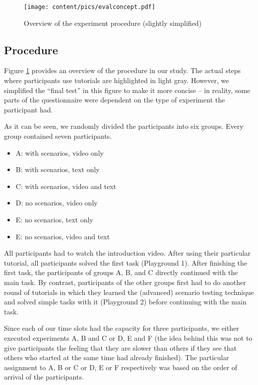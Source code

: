 \begin{figure}[b]
	\texttt{[image: content/pics/evalconcept.pdf]}
	\caption{Overview of the experiment procedure (slightly simplified)}
	\label{fig:evalconcept}
\end{figure}



\subsection{Procedure}
\label{subsec:procedure}
Figure \ref{fig:evalconcept} provides an overview of the procedure in our study. The actual steps where participants use tutorials are highlighted in light gray. However, we simplified the \enquote{final test} in this figure to make it more concise -- in reality, some parts of the questionnaire were dependent on the type of experiment the participant had.



As it can be seen, we randomly divided the participants into six groups. Every group contained seven participants. 


\begin{itemize}
	\item A: with scenarios, video only
	\item B: with scenarios, text only
	\item C: with scenarios, video and text
	\item D: no scenarios, video only
	\item E: no scenarios, text only
	\item E: no scenarios, video and text
\end{itemize}

All participants had to watch the introduction video. After using their particular tutorial, all participants solved the first task (Playground 1). After finishing the first task, the participants of groups A, B, and C directly continued with the main task. By contrast, participants of the other groups first had to do another round of tutorials in which they learned the (advanced) scenario testing technique and solved simple tasks with it (Playground 2) before continuing with the main task. 

Since each of our time slots had the capacity for three participants, we either executed experiments A, B and C or D, E and F (the idea behind this was not to give participants the feeling that they are slower than others if they see that others who started at the same time had already finished). The particular assignment to A, B or C or D, E or F respectively was based on the order of arrival of the participants.

